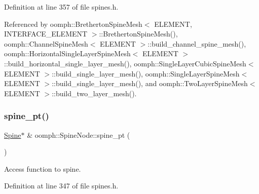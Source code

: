 Definition at line 357 of file spines.\+h.



Referenced by oomph\+::\+Bretherton\+Spine\+Mesh$<$ E\+L\+E\+M\+E\+N\+T, I\+N\+T\+E\+R\+F\+A\+C\+E\+\_\+\+E\+L\+E\+M\+E\+N\+T $>$\+::\+Bretherton\+Spine\+Mesh(), oomph\+::\+Channel\+Spine\+Mesh$<$ E\+L\+E\+M\+E\+N\+T $>$\+::build\+\_\+channel\+\_\+spine\+\_\+mesh(), oomph\+::\+Horizontal\+Single\+Layer\+Spine\+Mesh$<$ E\+L\+E\+M\+E\+N\+T $>$\+::build\+\_\+horizontal\+\_\+single\+\_\+layer\+\_\+mesh(), oomph\+::\+Single\+Layer\+Cubic\+Spine\+Mesh$<$ E\+L\+E\+M\+E\+N\+T $>$\+::build\+\_\+single\+\_\+layer\+\_\+mesh(), oomph\+::\+Single\+Layer\+Spine\+Mesh$<$ E\+L\+E\+M\+E\+N\+T $>$\+::build\+\_\+single\+\_\+layer\+\_\+mesh(), and oomph\+::\+Two\+Layer\+Spine\+Mesh$<$ E\+L\+E\+M\+E\+N\+T $>$\+::build\+\_\+two\+\_\+layer\+\_\+mesh().

\mbox{\label{classoomph_1_1SpineNode_a047fd6368eb9140f51128723a9e07dba}} 
\subsubsection{\texorpdfstring{spine\+\_\+pt()}{spine\_pt()}}
{\footnotesize\ttfamily \hyperlink{classoomph_1_1Spine}{Spine}$\ast$ \& oomph\+::\+Spine\+Node\+::spine\+\_\+pt (\begin{DoxyParamCaption}{ }\end{DoxyParamCaption})\hspace{0.3cm}{\ttfamily [inline]}}



Access function to spine. 



Definition at line 347 of file spines.\+h.



